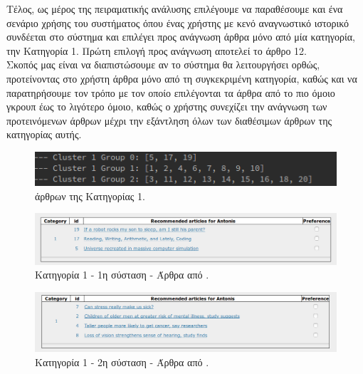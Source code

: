 Τέλος, ως μέρος της πειραματικής ανάλυσης επιλέγουμε να παραθέσουμε και ένα σενάριο χρήσης του συστήματος 
όπου ένας χρήστης με κενό αναγνωστικό ιστορικό 
συνδέεται στο σύστημα και επιλέγει προς ανάγνωση άρθρα μόνο από μία κατηγορία, 
την Κατηγορία {\en {\#}}1. 
Πρώτη επιλογή προς ανάγνωση αποτελεί το άρθρο {\en {\#}}12. \\
Σκοπός μας είναι να διαπιστώσουμε αν το σύστημα θα λειτουργήσει ορθώς, 
προτείνοντας στο χρήστη άρθρα μόνο από τη συγκεκριμένη κατηγορία, καθώς και να 
παρατηρήσουμε τον τρόπο με τον οποίο επιλέγονται τα άρθρα από το πιο όμοιο γκρουπ 
έως το λιγότερο όμοιο, καθώς ο χρήστης συνεχίζει την ανάγνωση  των προτεινόμενων άρθρων 
μέχρι την εξάντληση όλων των διαθέσιμων άρθρων της κατηγορίας αυτής. \\

\begin{figure}[!ht] \centering
\centerline{
    \includegraphics[scale=0.85]{static/figures/category/1.png}}
    \caption{{} άρθρων της Κατηγορίας {\en {\#}}1.}
    \label{}
\end{figure} 

\begin{figure}[!ht] \centering
\centerline{
    \includegraphics[scale=0.43]{static/figures/category/1a.png}}
    \caption{Κατηγορία {\en {\#}}1 - 1η σύσταση - Άρθρα από {} .}
    \label{}
\end{figure} 

\begin{figure}[!ht] \centering
\centerline{
    \includegraphics[scale=0.43]{static/figures/category/1b.png}}
    \caption{Κατηγορία {\en {\#}}1 - 2η σύσταση - Άρθρα από {} .}
    \label{}
\end{figure} 


